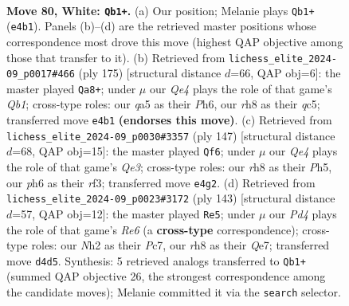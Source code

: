 \documentclass[11pt]{article}
\begin{document}
\clearpage

\begin{figure}[p]\centering
\begin{subfigure}{0.46\textwidth}\centering
\resizebox{\linewidth}{!}{%
\newchessgame
\chessboard[
  setfen={1k3r1r/p5p1/7p/q5PP/3PQ3/4P3/7N/4b2K w - - 1 80},
  showmover=false,
  pgfstyle=straightmove, color=movearrow, markmove={e4-b1}
]}
\caption{}
\end{subfigure}\hfill
\begin{subfigure}{0.46\textwidth}\centering
\resizebox{\linewidth}{!}{%
\newchessgame
\chessboard[
  setfen={1q4k1/5pp1/K6p/2Q5/p7/P5P1/1P3R1P/1b6 b - - 46 88},
  showmover=false,
  pgfstyle=straightmove, color=movearrow, markmove={b8-a8}
]}
\caption{}
\end{subfigure}
\\[4pt]
\begin{subfigure}{0.46\textwidth}\centering
\resizebox{\linewidth}{!}{%
\newchessgame
\chessboard[
  setfen={8/6k1/4q1p1/5p1p/7P/1p3RP1/1P3R1K/8 b - - 1 74},
  showmover=false,
  pgfstyle=straightmove, color=movearrow, markmove={e6-f6}
]}
\caption{}
\end{subfigure}\hfill
\begin{subfigure}{0.46\textwidth}\centering
\resizebox{\linewidth}{!}{%
\newchessgame
\chessboard[
  setfen={6k1/2p1q3/8/pP1p4/P4R1p/4r2P/B5P1/5R1K b - - 7 72},
  showmover=false,
  pgfstyle=straightmove, color=movearrow, markmove={e3-e5}
]}
\caption{}
\end{subfigure}
\caption{\textbf{Move 80, White: \texttt{Qb1+}.} (a) Our position; Melanie plays \texttt{Qb1+} (\texttt{e4b1}). Panels (b)--(d) are the retrieved master positions whose correspondence most drove this move (highest QAP objective among those that transfer to it). (b) Retrieved from \texttt{lichess\_elite\_2024-09\_p0017\#466} (ply 175) [structural distance $d$=66, QAP obj=6]: the master played \texttt{Qa8+}; under $\mu$ our \emph{Qe4} plays the role of that game's \emph{Qb1}; cross-type roles: our \emph{q}a5 as their \emph{P}h6, our \emph{r}h8 as their \emph{q}c5; transferred move \texttt{e4b1} \textbf{(endorses this move)}. (c) Retrieved from \texttt{lichess\_elite\_2024-09\_p0030\#3357} (ply 147) [structural distance $d$=68, QAP obj=15]: the master played \texttt{Qf6}; under $\mu$ our \emph{Qe4} plays the role of that game's \emph{Qe3}; cross-type roles: our \emph{r}h8 as their \emph{P}h5, our \emph{p}h6 as their \emph{r}f3; transferred move \texttt{e4g2}. (d) Retrieved from \texttt{lichess\_elite\_2024-09\_p0023\#3172} (ply 143) [structural distance $d$=57, QAP obj=12]: the master played \texttt{Re5}; under $\mu$ our \emph{Pd4} plays the role of that game's \emph{Re6} (a \textbf{cross-type} correspondence); cross-type roles: our \emph{N}h2 as their \emph{P}c7, our \emph{r}h8 as their \emph{Q}e7; transferred move \texttt{d4d5}. Synthesis: 5 retrieved analogs transferred to \texttt{Qb1+} (summed QAP objective 26, the strongest correspondence among the candidate moves); Melanie committed it via the \texttt{search} selector.}
\label{fig:thought-m158}
\end{figure}
\end{document}
